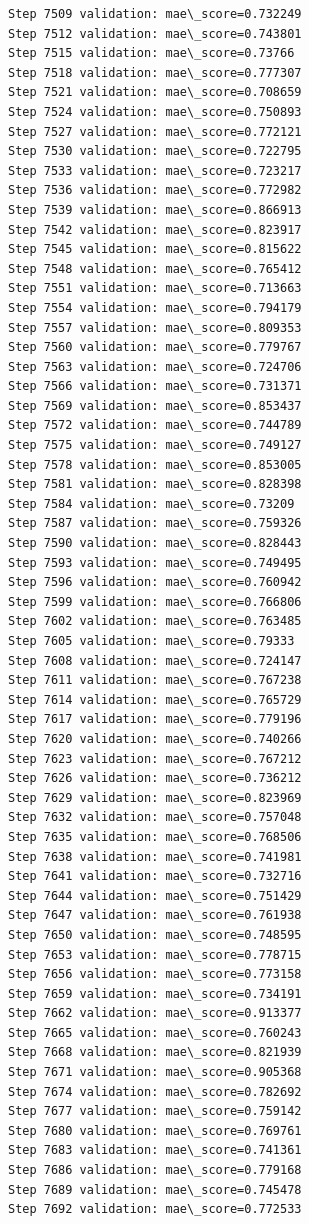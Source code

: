 \documentclass[11pt]{article}
\begin{document}
\begin{Verbatim}[commandchars=\\\{\}]
Step 7509 validation: mae\_score=0.732249
Step 7512 validation: mae\_score=0.743801
Step 7515 validation: mae\_score=0.73766
Step 7518 validation: mae\_score=0.777307
Step 7521 validation: mae\_score=0.708659
Step 7524 validation: mae\_score=0.750893
Step 7527 validation: mae\_score=0.772121
Step 7530 validation: mae\_score=0.722795
Step 7533 validation: mae\_score=0.723217
Step 7536 validation: mae\_score=0.772982
Step 7539 validation: mae\_score=0.866913
Step 7542 validation: mae\_score=0.823917
Step 7545 validation: mae\_score=0.815622
Step 7548 validation: mae\_score=0.765412
Step 7551 validation: mae\_score=0.713663
Step 7554 validation: mae\_score=0.794179
Step 7557 validation: mae\_score=0.809353
Step 7560 validation: mae\_score=0.779767
Step 7563 validation: mae\_score=0.724706
Step 7566 validation: mae\_score=0.731371
Step 7569 validation: mae\_score=0.853437
Step 7572 validation: mae\_score=0.744789
Step 7575 validation: mae\_score=0.749127
Step 7578 validation: mae\_score=0.853005
Step 7581 validation: mae\_score=0.828398
Step 7584 validation: mae\_score=0.73209
Step 7587 validation: mae\_score=0.759326
Step 7590 validation: mae\_score=0.828443
Step 7593 validation: mae\_score=0.749495
Step 7596 validation: mae\_score=0.760942
Step 7599 validation: mae\_score=0.766806
Step 7602 validation: mae\_score=0.763485
Step 7605 validation: mae\_score=0.79333
Step 7608 validation: mae\_score=0.724147
Step 7611 validation: mae\_score=0.767238
Step 7614 validation: mae\_score=0.765729
Step 7617 validation: mae\_score=0.779196
Step 7620 validation: mae\_score=0.740266
Step 7623 validation: mae\_score=0.767212
Step 7626 validation: mae\_score=0.736212
Step 7629 validation: mae\_score=0.823969
Step 7632 validation: mae\_score=0.757048
Step 7635 validation: mae\_score=0.768506
Step 7638 validation: mae\_score=0.741981
Step 7641 validation: mae\_score=0.732716
Step 7644 validation: mae\_score=0.751429
Step 7647 validation: mae\_score=0.761938
Step 7650 validation: mae\_score=0.748595
Step 7653 validation: mae\_score=0.778715
Step 7656 validation: mae\_score=0.773158
Step 7659 validation: mae\_score=0.734191
Step 7662 validation: mae\_score=0.913377
Step 7665 validation: mae\_score=0.760243
Step 7668 validation: mae\_score=0.821939
Step 7671 validation: mae\_score=0.905368
Step 7674 validation: mae\_score=0.782692
Step 7677 validation: mae\_score=0.759142
Step 7680 validation: mae\_score=0.769761
Step 7683 validation: mae\_score=0.741361
Step 7686 validation: mae\_score=0.779168
Step 7689 validation: mae\_score=0.745478
Step 7692 validation: mae\_score=0.772533

\end{Verbatim}
\end{document}
